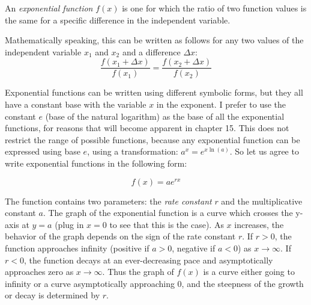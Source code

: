 \documentclass[
  letterpaper,
  DIV=11,
  numbers=noendperiod]{scrreprt}
\begin{document}
\begin{tcolorbox}[enhanced jigsaw, arc=.35mm, colframe=quarto-callout-note-color-frame, left=2mm, opacitybacktitle=0.6, breakable, title=\textcolor{quarto-callout-note-color}{\faInfo}\hspace{0.5em}{Definition}, toprule=.15mm, coltitle=black, bottomtitle=1mm, toptitle=1mm, colback=white, leftrule=.75mm, colbacktitle=quarto-callout-note-color!10!white, titlerule=0mm, opacityback=0, rightrule=.15mm, bottomrule=.15mm]

An \emph{exponential function} \(f(x)\) is one for which the ratio of
two function values is the same for a specific difference in the
independent variable.

\end{tcolorbox}

Mathematically speaking, this can be written as follows for any two
values of the independent variable \(x_1\) and \(x_2\) and a difference
\(\Delta x\):
\[ \frac{f(x_1 + \Delta x)}{f(x_1)} = \frac{f(x_2 + \Delta x)}{f(x_2)}\]

Exponential functions can be written using different symbolic forms, but
they all have a constant base with the variable \(x\) in the exponent. I
prefer to use the constant \(e\) (base of the natural logarithm) as the
base of all the exponential functions, for reasons that will become
apparent in chapter 15. This does not restrict the range of possible
functions, because any exponential function can be expressed using base
\(e\), using a transformation: \(a^x = e^{x \ln(a)}\). So let us agree
to write exponential functions in the following form:

\begin{equation}
 f(x) = a e^{rx}
\label{eq:exp_funk}
\end{equation}

The function contains two parameters: the
\emph{rate constant} \(r\) and the
multiplicative constant \(a\). The graph of the exponential function is
a curve which crosses the y-axis at \(y=a\) (plug in \(x=0\) to see that
this is the case). As \(x\) increases, the behavior of the graph depends
on the sign of the rate constant \(r\). If \(r>0\), the function
approaches infinity (positive if \(a>0\), negative if \(a<0\)) as
\(x \to \infty\). If \(r<0\), the function decays at an ever-decreasing
pace and asymptotically approaches zero as \(x \to \infty\). Thus the
graph of \(f(x)\) is a curve either going to infinity or a curve
asymptotically approaching 0, and the steepness of the growth or decay
is determined by \(r\).
\end{document}
